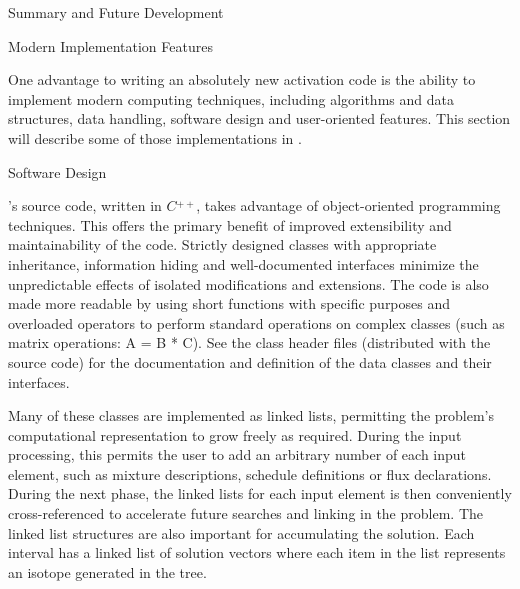 
\begin{chapter}{Summary and Future Development}
  
  \begin{section}{Modern Implementation Features\label{sec:summary.modern}}
    
    One advantage to writing an absolutely new activation code is the
    ability to implement modern computing techniques, including
    algorithms and data structures, data handling, software design and
    user-oriented features.  This section will describe some of those
    implementations in \ALARA.

    \begin{subsection}{Software Design}
      
      \ALARA's source code, written in $C\!\!\!\stackrel{+\!\!+}{}$,
      takes advantage of object-oriented programming techniques.  This
      offers the primary benefit of improved extensibility and
      maintainability of the code.  Strictly designed classes with
      appropriate inheritance, information hiding and well-documented
      interfaces minimize the unpredictable effects of isolated
      modifications and extensions.  The code is also made more
      readable by using short functions with specific purposes and
      overloaded operators to perform standard operations on complex
      classes (such as matrix operations: A = B * C).  See the class
      header files (distributed with the source code) for the
      documentation and definition of the data classes and their
      interfaces.
      
      Many of these classes are implemented as linked lists,
      permitting the problem's computational representation to grow
      freely as required.  During the input processing, this permits
      the user to add an arbitrary number of each input element, such
      as mixture descriptions, schedule definitions or flux
      declarations.  During the next phase, the linked lists for each
      input element is then conveniently cross-referenced to
      accelerate future searches and linking in the problem.  The
      linked list structures are also important for accumulating the
      solution.  Each interval has a linked list of solution vectors
      where each item in the list represents an isotope generated in
      the tree.
    \end{subsection}


\end{section}
\end{chapter}
